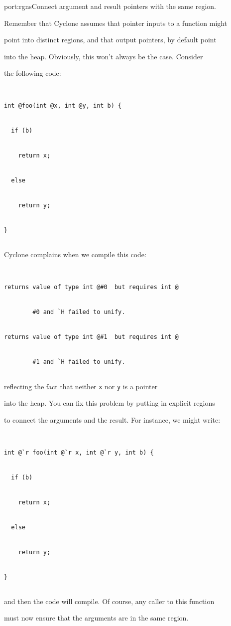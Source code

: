 \begin{porta}{port:rgns}{Connect argument and result pointers with the same region.}





Remember that Cyclone assumes that pointer inputs to a function might


point into distinct regions, and that output pointers, by default point


into the heap.  Obviously, this won't always be the case.  Consider


the following code:


\begin{verbatim}


int @foo(int @x, int @y, int b) {


  if (b)


    return x;


  else


    return y;


}


\end{verbatim}


Cyclone complains when we compile this code:


\begin{verbatim}


returns value of type int @#0  but requires int @


        #0 and `H failed to unify. 


returns value of type int @#1  but requires int @


        #1 and `H failed to unify. 


\end{verbatim}


reflecting the fact that neither \texttt{x} nor \texttt{y} is a pointer


into the heap.  You can fix this problem by putting in explicit regions


to connect the arguments and the result.  For instance, we might write:


\begin{verbatim}


int @`r foo(int @`r x, int @`r y, int b) {


  if (b)


    return x;


  else


    return y;


}


\end{verbatim}


and then the code will compile.  Of course, any caller to this function


must now ensure that the arguments are in the same region.  


\end{porta}





